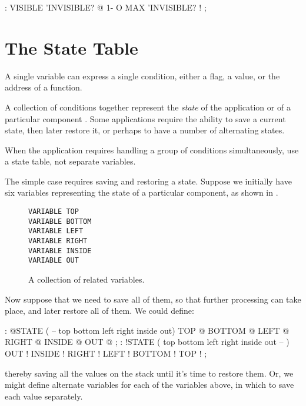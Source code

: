 \begin{Code}
: VISIBLE   'INVISIBLE? @  1-  O MAX  'INVISIBLE? ! ;
\end{Code}
%

\section{The State Table}%

A single variable can express a single condition, either a flag, a value, or
the address of a function.

A collection of conditions together represent the \emph{state} of the
application or of a particular component \cite{slater83}. Some applications require the
ability to save a current state, then later restore it, or perhaps to have a
number of alternating states.

\begin{tip}
When the application requires handling a group of conditions
simultaneously, use a state table, not separate variables.
\end{tip}

The simple case requires saving and restoring a state. Suppose we initially
have six variables representing the state of a particular component, as
shown in .
\begin{figure*}[hhhh]
\caption{A collection of related variables.}
\begin{center}
\begin{BVerbatim}
VARIABLE TOP
VARIABLE BOTTOM
VARIABLE LEFT
VARIABLE RIGHT
VARIABLE INSIDE
VARIABLE OUT
\end{BVerbatim}
\end{center}
\end{figure*}

Now suppose that we need to save all of them, so that further processing
can take place, and later restore all of them. We could define:

\begin{Code}
: @STATE ( -- top bottom left right inside out)
   TOP @  BOTTOM @  LEFT @  RIGHT @  INSIDE @  OUT @ ;
: !STATE ( top bottom left right inside out -- )
   OUT !  INSIDE !  RIGHT !  LEFT !  BOTTOM !  TOP ! ;
\end{Code}
thereby saving all the values on the stack until it's time to restore them.
Or, we might define alternate variables for each of the variables above, in
which to save each value separately.

